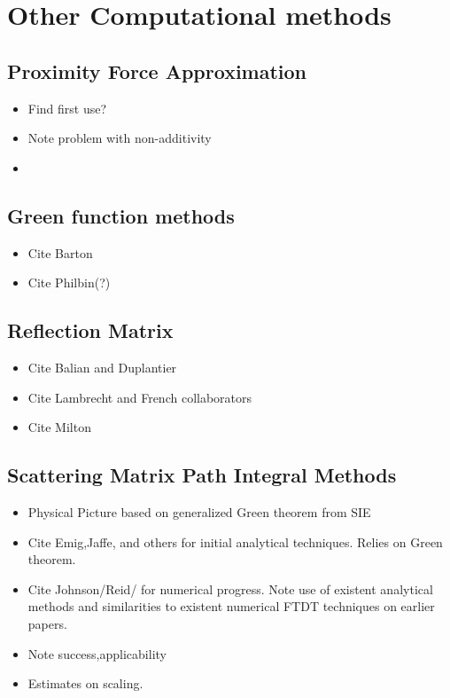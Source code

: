 \section{Other Computational methods}

\subsection{Proximity Force Approximation}

\begin{itemize}
\item Find first use?
\item Note problem with non-additivity
\item 
\end{itemize}

\subsection{Green function methods}

\begin{itemize}
\item Cite Barton
\item Cite Philbin(?)
\end{itemize}

\subsection{Reflection Matrix}

\begin{itemize}
\item Cite Balian and Duplantier
\item Cite Lambrecht and French collaborators
\item Cite Milton
\end{itemize}

\subsection{Scattering Matrix Path Integral Methods}

\begin{itemize}
\item Physical Picture based on generalized Green theorem from SIE
\item Cite Emig,Jaffe,  and others for initial analytical techniques.  Relies on Green theorem.
\item Cite Johnson/Reid/ for numerical progress.  Note use of existent analytical methods and similarities to existent numerical FTDT techniques on earlier papers.  
\item Note success,applicability
\item Estimates on scaling.
\end{itemize}

